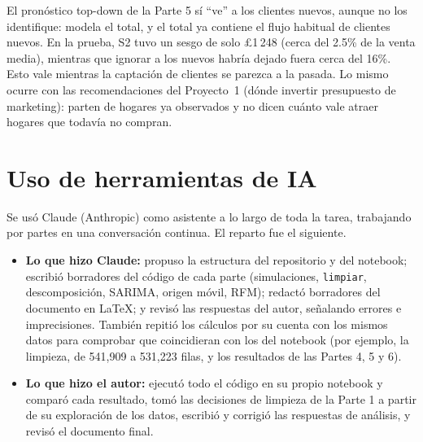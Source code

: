 \documentclass[11pt]{article}
\begin{document}
El pronóstico top-down de la Parte 5 sí ``ve'' a los clientes nuevos, aunque no los identifique: modela el total, y el total ya contiene el flujo habitual de clientes nuevos. En la prueba, S2 tuvo un sesgo de solo \pounds{}1\,248 (cerca del 2.5\% de la venta media), mientras que ignorar a los nuevos habría dejado fuera cerca del 16\%. Esto vale mientras la captación de clientes se parezca a la pasada. Lo mismo ocurre con las recomendaciones del Proyecto~1 (dónde invertir presupuesto de marketing): parten de hogares ya observados y no dicen cuánto vale atraer hogares que todavía no compran.

\section*{Uso de herramientas de IA}
Se usó Claude (Anthropic) como asistente a lo largo de toda la tarea, trabajando por partes en una conversación continua. El reparto fue el siguiente.
\begin{itemize}
  \item \textbf{Lo que hizo Claude:} propuso la estructura del repositorio y del notebook; escribió borradores del código de cada parte (simulaciones, \texttt{limpiar}, descomposición, SARIMA, origen móvil, RFM); redactó borradores del documento en \LaTeX{}; y revisó las respuestas del autor, señalando errores e imprecisiones. También repitió los cálculos por su cuenta con los mismos datos para comprobar que coincidieran con los del notebook (por ejemplo, la limpieza, de 541{,}909 a 531{,}223 filas, y los resultados de las Partes 4, 5 y 6).
  \item \textbf{Lo que hizo el autor:} ejecutó todo el código en su propio notebook y comparó cada resultado, tomó las decisiones de limpieza de la Parte 1 a partir de su exploración de los datos, escribió y corrigió las respuestas de análisis, y revisó el documento final.
\end{itemize}
 
\end{document}
